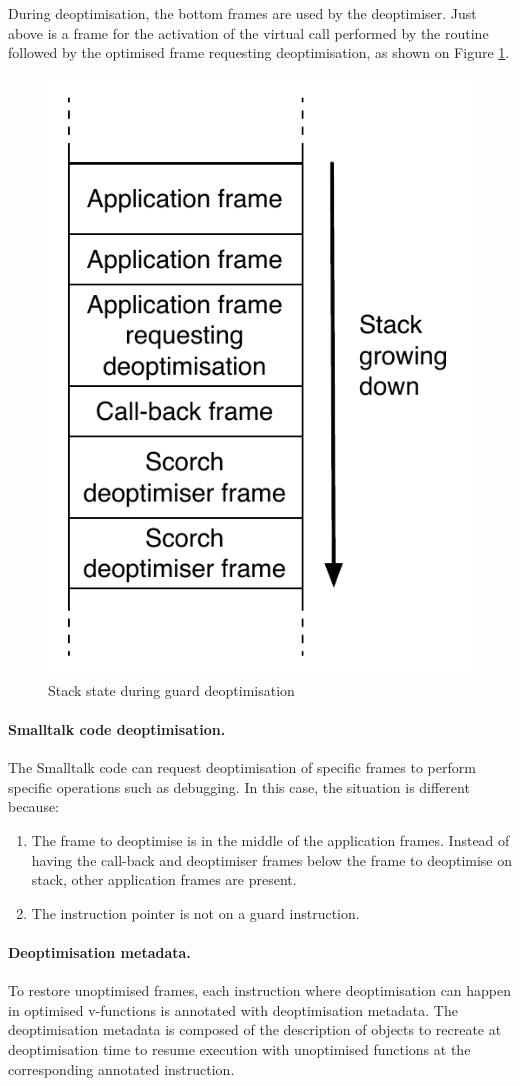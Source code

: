 \documentclass[a4paper,12pt,twoside]{../includes/ThesisStyle}
\begin{document}
During deoptimisation, the bottom frames are used by the deoptimiser. Just above is a frame for the activation of the virtual call performed by the routine followed by the optimised frame requesting deoptimisation, as shown on Figure \ref{fig:DeoptCallBackStack}.

\begin{figure}[h!]
    \begin{center}
        \includegraphics[width=0.4\linewidth]{DeoptCallBackStack}
        \caption{Stack state during guard deoptimisation}
        \label{fig:DeoptCallBackStack}
    \end{center}
\end{figure}


\paragraph{Smalltalk code deoptimisation.}The Smalltalk code can request deoptimisation of specific frames to perform specific operations such as debugging. In this case, the situation is different because:
\begin{enumerate}
	\item The frame to deoptimise is in the middle of the application frames. Instead of having the call-back and deoptimiser frames below the frame to deoptimise on stack, other application frames are present.
	\item The instruction pointer is not on a guard instruction.
\end{enumerate}

\paragraph{Deoptimisation metadata.} To restore unoptimised frames, each instruction where deoptimisation can happen in optimised v-functions is annotated with deoptimisation metadata. The deoptimisation metadata is composed of the description of objects to recreate at deoptimisation time to resume execution with unoptimised functions at the corresponding annotated instruction. 
\end{document}
